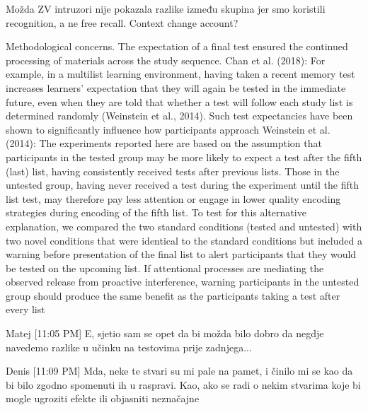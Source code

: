\documentclass[../main.tex]{subfiles}
\begin{document}
Možda ZV intruzori nije pokazala razlike između skupina jer smo koristili 
recognition, a ne free recall.
Context change account?






Methodological concerns. The expectation of a final test ensured the
continued processing of materials across the study sequence.
Chan et al. (2018): %
For example, in a multilist learning environment, having taken a
recent memory test increases learners’ expectation that they will
again be tested in the immediate future, even when they are told
that whether a test will follow each study list is determined
randomly (Weinstein et al., 2014). Such test expectancies have
been shown to significantly influence how participants approach
Weinstein et al. (2014):
The experiments reported here are based on the assumption that
participants in the tested group may be more likely to expect a test
after the fifth (last) list, having consistently received tests after
previous lists. Those in the untested group, having never received
a test during the experiment until the fifth list test, may therefore
pay less attention or engage in lower quality encoding strategies
during encoding of the fifth list. To test for this alternative explanation, 
we compared the two standard conditions (tested and
untested) with two novel conditions that were identical to the
standard conditions but included a warning before presentation of
the final list to alert participants that they would be tested on the
upcoming list. If attentional processes are mediating the observed
release from proactive interference, warning participants in the
untested group should produce the same benefit as the participants
taking a test after every list


Matej [11:05 PM]
E, sjetio sam se opet da bi možda bilo dobro da negdje navedemo razlike u učinku na testovima prije zadnjega...

Denis [11:09 PM]
Mda, neke te stvari su mi pale na pamet, i činilo mi se kao da bi bilo zgodno spomenuti ih u raspravi. Kao, ako se radi o nekim stvarima koje bi mogle ugroziti efekte ili objasniti neznačajne
\end{document}
